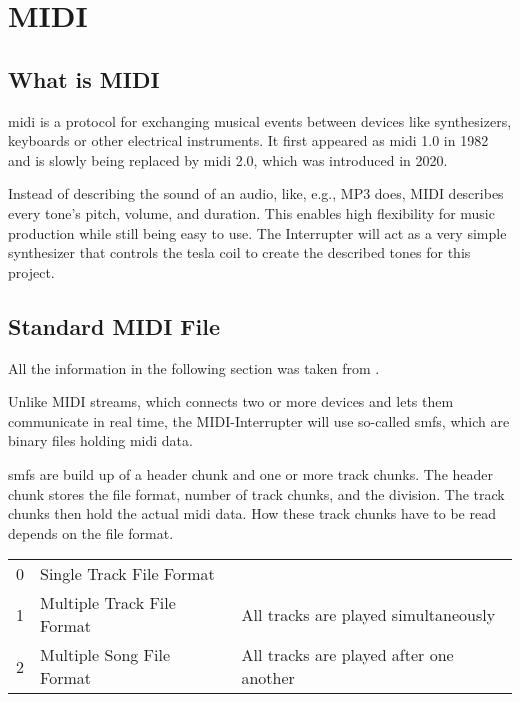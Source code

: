 \setchapterpreamble[u]{\margintoc}

\chapter{MIDI}

\section{What is MIDI}

\gls{midi} is a protocol for exchanging musical events between devices like synthesizers, keyboards or other electrical instruments. It first appeared as \gls{midi} 1.0 in 1982 and is slowly being replaced by \gls{midi} 2.0, which was introduced in 2020.

Instead of describing the sound of an audio, like, e.g., MP3 does, MIDI describes every tone's pitch, volume, and duration. This enables high flexibility for music production while still being easy to use. The Interrupter will act as a very simple synthesizer that controls the tesla coil to create the described tones for this project. 

\section{Standard MIDI File}

All the information in the following section was taken from .

Unlike MIDI streams, which connects two or more devices and lets them communicate in real time, the MIDI-Interrupter will use so-called \glspl{smf}, which are binary files holding \gls{midi} data.

\glspl{smf} are build up of a header chunk and one or more track chunks. The header chunk stores the file format, number of track chunks, and the division. The track chunks then hold the actual \gls{midi} data. How these track chunks have to be read depends on the file format.

\begin{tabular}{cll@{}}
    \midrule
    0 & Single Track File Format   & \\
    1 & Multiple Track File Format & All tracks are played simultaneously\\
    2 & Multiple Song File Format  & All tracks are played after one another\\
    \midrule
\end{tabular}

